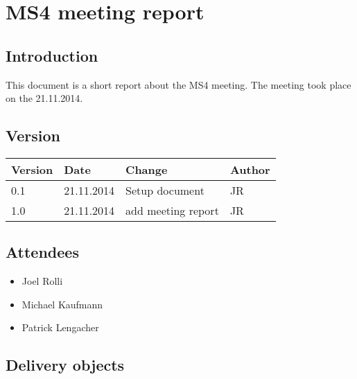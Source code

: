 
\chapter{MS4 meeting report} %

\label{ChapterX} %



\section{Introduction}

This document is a short report about the MS4 meeting. The meeting took place on the 21.11.2014.

\section{Version}


\begin{tabular}{| p{1.5cm} | p{2cm} | p{9cm} | p{1.5cm} |}
    \hline
    Version 	& Date      		& Change & Author 								\\ \hline
    0.1    		& 21.11.2014        & Setup document        				& JR 	\\ \hline
    1.0 		& 21.11.2014 		& add meeting report 					& JR 	\\ \hline
\end{tabular}


\section{Attendees}
\begin{itemize}
\item Joel Rolli
\item Michael Kaufmann
\item Patrick Lengacher
\end{itemize}

\section{Delivery objects}

